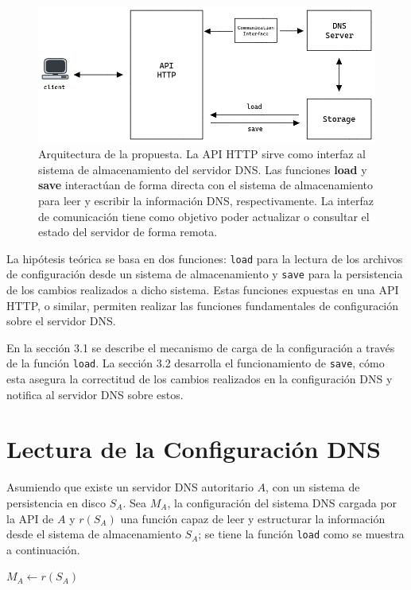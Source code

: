\begin{figure}[!ht]
    \centering
    \includegraphics[width=\linewidth]{draws/proposal.png}
    \caption{Arquitectura de la propuesta. La API HTTP sirve como interfaz al sistema de almacenamiento del servidor DNS. Las funciones \textbf{load} y \textbf{save} interactúan de forma directa con el sistema de almacenamiento para leer y escribir la información DNS, respectivamente. La interfaz de comunicación tiene como objetivo poder actualizar o consultar el estado del servidor de forma remota.}
\end{figure}

La hipótesis teórica se basa en dos funciones: \verb+load+ para la lectura de los archivos de configuración desde un sistema de almacenamiento y \verb+save+ para la persistencia de los cambios realizados a dicho sistema. Estas funciones expuestas en una API HTTP, o similar, permiten realizar las funciones fundamentales de configuración sobre el servidor DNS.

En la sección 3.1 se describe el mecanismo de carga de la configuración a través de la función \verb|load|. La sección 3.2 desarrolla el funcionamiento de \verb|save|, cómo esta asegura la correctitud de los cambios realizados en la configuración DNS y notifica al servidor DNS sobre estos.

\section{Lectura de la Configuración DNS}

Asumiendo que existe un servidor DNS autoritario $A$, con un sistema de persistencia en disco $S_A$. Sea $M_A$, la configuración del sistema DNS cargada por la API de $A$ y $r(S_A)$ una función capaz de leer y estructurar la información desde el sistema de almacenamiento $S_A$; se tiene la función \verb+load+ como se muestra a continuación.

\begin{algorithmic}
    \State $M_A \leftarrow r(S_A)$
\EndProcedure
\end{algorithmic}


